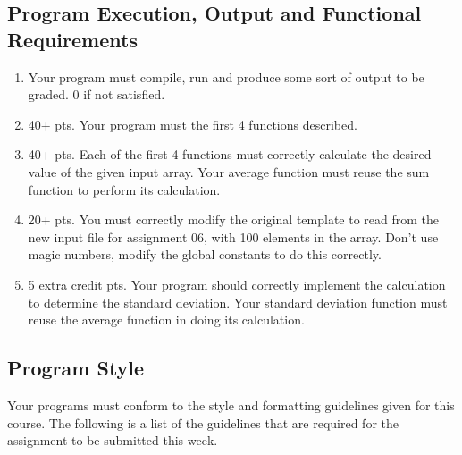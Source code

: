 \documentclass[11pt]{article}
\begin{document}
\subsection*{Program Execution, Output and Functional Requirements}
\label{sec-5-1}

\begin{enumerate}
\item Your program must compile, run and produce some sort of output to be
graded. 0 if not satisfied.
\item 40+ pts.  Your program must the first 4 functions described.
\item 40+ pts. Each of the first 4 functions must correctly calculate the desired
value of the given input array.  Your average function must reuse the sum
function to perform its calculation.
\item 20+ pts. You must correctly modify the original template to read from the new
input file for assignment 06, with 100 elements in the array.  Don't use
magic numbers, modify the global constants to do this correctly.
\item 5 extra credit pts. Your program should correctly implement the calculation to
determine the standard deviation.  Your standard deviation function must reuse
the average function in doing its calculation.
\end{enumerate}

\subsection*{Program Style}
\label{sec-5-2}

Your programs must conform to the style and formatting guidelines
given for this course.  The following is a list of the guidelines that
are required for the assignment to be submitted this week.
\end{document}
